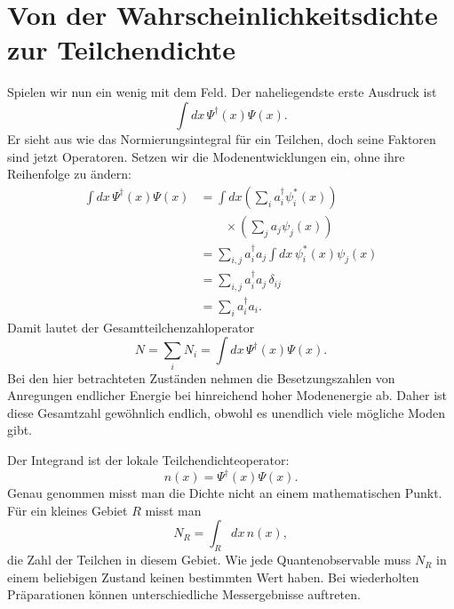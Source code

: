 \section{Von der Wahrscheinlichkeitsdichte zur Teilchendichte}

Spielen wir nun ein wenig mit dem Feld. Der naheliegendste erste Ausdruck ist
\begin{equation}
\int dx\,\Psi^\dagger(x)\Psi(x).
\end{equation}
Er sieht aus wie das Normierungsintegral für ein Teilchen, doch seine Faktoren sind jetzt Operatoren. Setzen wir die Modenentwicklungen ein, ohne ihre Reihenfolge zu ändern:
\begin{align}
\int dx\,\Psi^\dagger(x)\Psi(x)
&=\int dx
\left(\sum_i a_i^\dagger\psi_i^*(x)\right)\\
&\qquad\times\left(\sum_j a_j\psi_j(x)\right) \\
&=\sum_{i,j}a_i^\dagger a_j
\int dx\,\psi_i^*(x)\psi_j(x) \\
&=\sum_{i,j}a_i^\dagger a_j\,\delta_{ij} \\
&=\sum_i a_i^\dagger a_i.
\label{eq:l07-number-derivation}
\end{align}
Damit lautet der Gesamtteilchenzahloperator
\begin{equation}
N=\sum_i N_i
=\int dx\,\Psi^\dagger(x)\Psi(x).
\label{eq:l07-total-number}
\end{equation}
Bei den hier betrachteten Zuständen nehmen die Besetzungszahlen von Anregungen endlicher Energie bei hinreichend hoher Modenenergie ab. Daher ist diese Gesamtzahl gewöhnlich endlich, obwohl es unendlich viele mögliche Moden gibt.

Der Integrand ist der lokale Teilchendichteoperator:
\begin{equation}
n(x)=\Psi^\dagger(x)\Psi(x).
\label{eq:l07-density}
\end{equation}
Genau genommen misst man die Dichte nicht an einem mathematischen Punkt. Für ein kleines Gebiet \(R\) misst man
\begin{equation}
N_R=\int_R dx\,n(x),
\label{eq:l07-regional-number}
\end{equation}
die Zahl der Teilchen in diesem Gebiet. Wie jede Quantenobservable muss \(N_R\) in einem beliebigen Zustand keinen bestimmten Wert haben. Bei wiederholten Präparationen können unterschiedliche Messergebnisse auftreten.

\begin{classroomqa}
\end{classroomqa}


